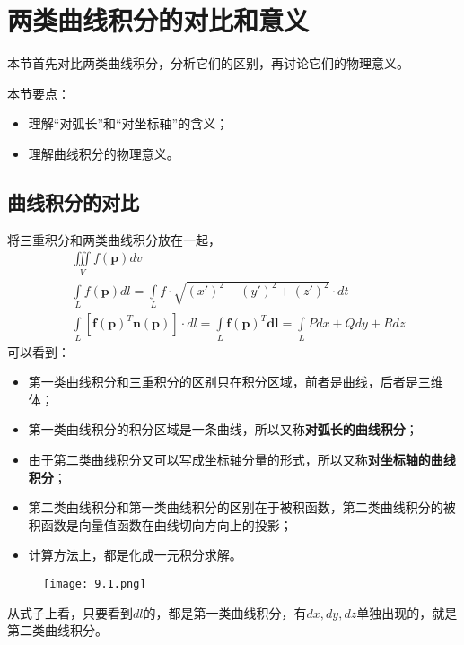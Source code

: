 \section{两类曲线积分的对比和意义}

本节首先对比两类曲线积分，分析它们的区别，再讨论它们的物理意义。

本节要点：
\begin{itemize}
    \item 理解“对弧长”和“对坐标轴”的含义；
    \item 理解曲线积分的物理意义。
\end{itemize}

\subsection{曲线积分的对比}

将三重积分和两类曲线积分放在一起，
\begin{align*}
&\iiint\limits_V{f\left( \boldsymbol{p} \right) dv} \\
&\int\limits_L{f\left( \boldsymbol{p} \right) dl}=\int\limits_L{f\cdot \sqrt{\left( x' \right) ^2+\left( y' \right) ^2+\left( z' \right) ^2}\cdot dt} \\
&\int\limits_L{\left[ \boldsymbol{f}\left( \boldsymbol{p} \right) ^T\mathbf{n}\left( \boldsymbol{p} \right) \right] \cdot dl}=\int\limits_L{\boldsymbol{f}\left( \boldsymbol{p} \right) ^T\boldsymbol{dl}}=\int\limits_L{Pdx+Qdy+Rdz}
\end{align*}
可以看到：
\begin{itemize}
    \item 第一类曲线积分和三重积分的区别只在积分区域，前者是曲线，后者是三维体；
    \item 第一类曲线积分的积分区域是一条曲线，所以又称{\bf 对弧长的曲线积分}；
    \item 由于第二类曲线积分又可以写成坐标轴分量的形式，所以又称{\bf 对坐标轴的曲线积分}；
    \item 第二类曲线积分和第一类曲线积分的区别在于被积函数，第二类曲线积分的被积函数是向量值函数在曲线切向方向上的投影；
    \item 计算方法上，都是化成一元积分求解。
\end{itemize}

\begin{figure}[h]
\centering
\texttt{[image: 9.1.png]}
\end{figure}

\begin{tcolorbox}
从式子上看，只要看到$dl$的，都是第一类曲线积分，有$dx,dy,dz$单独出现的，就是第二类曲线积分。
\end{tcolorbox}


